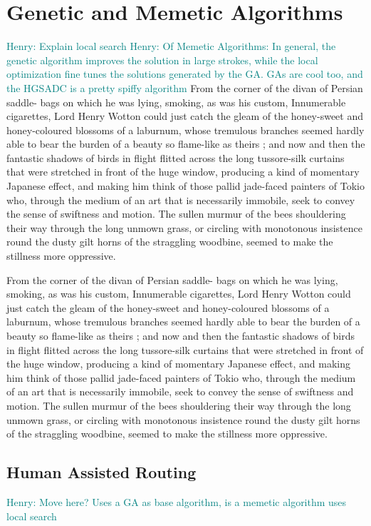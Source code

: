 \documentclass{sig-alternate}
\newcommand{\allcomments}[1]{{#1}}
\newcommand{\hfcomment}[1]{\textcolor{Teal}{\allcomments{Henry: {#1}}}}
\begin{document}
\section{Genetic and Memetic Algorithms}
\hfcomment{Explain local search}
\hfcomment{Of Memetic Algorithms: In general, the genetic algorithm improves the solution in large strokes, while the local optimization fine tunes the solutions generated by the GA. GAs are cool too, and the HGSADC is a pretty spiffy algorithm}
From the corner of the divan of Persian saddle- 
bags on which he was lying, smoking, as was his 
custom, Innumerable cigarettes, Lord Henry Wotton 
could just catch the gleam of the honey-sweet and 
honey-coloured blossoms of a laburnum, whose 
tremulous branches seemed hardly able to bear the 
burden of a beauty so flame-like as theirs ; and 
now and then the fantastic shadows of birds in 
flight flitted across the long tussore-silk curtains 
that were stretched in front of the huge window, 
producing a kind of momentary Japanese effect, 
and making him think of those pallid jade-faced 
painters of Tokio who, through the medium of an 
art that is necessarily immobile, seek to convey the 
sense of swiftness and motion. The sullen murmur 
of the bees shouldering their way through the long 
unmown grass, or circling with monotonous insistence 
round the dusty gilt horns of the straggling woodbine, 
seemed to make the stillness more oppressive.

From the corner of the divan of Persian saddle- 
bags on which he was lying, smoking, as was his 
custom, Innumerable cigarettes, Lord Henry Wotton 
could just catch the gleam of the honey-sweet and 
honey-coloured blossoms of a laburnum, whose 
tremulous branches seemed hardly able to bear the 
burden of a beauty so flame-like as theirs ; and 
now and then the fantastic shadows of birds in 
flight flitted across the long tussore-silk curtains 
that were stretched in front of the huge window, 
producing a kind of momentary Japanese effect, 
and making him think of those pallid jade-faced 
painters of Tokio who, through the medium of an 
art that is necessarily immobile, seek to convey the 
sense of swiftness and motion. The sullen murmur 
of the bees shouldering their way through the long 
unmown grass, or circling with monotonous insistence 
round the dusty gilt horns of the straggling woodbine, 
seemed to make the stillness more oppressive.

\subsection{Human Assisted Routing}
\label{sec:humans}
\hfcomment{Move here? Uses a GA as base algorithm, is a memetic algorithm uses local search}
\end{document}
